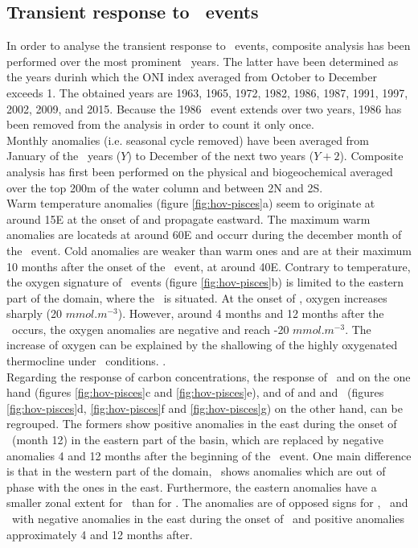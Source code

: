 \clearpage

\subsection{Transient response to \nino\ events}

In order to analyse the transient response to \nino\ events, composite analysis has been performed over the most prominent \nino\ years. The latter have been determined as the years durinh which the ONI index averaged from October to December exceeds 1. The obtained years are 1963, 1965, 1972, 1982, 1986, 1987, 1991, 1997, 2002, 2009, and 2015. Because the 1986 \nino\ event extends over two years, 1986 has been removed from the analysis in order to count it only once.\\
 
Monthly anomalies (i.e. seasonal cycle removed) have been averaged from January of the \nino\ years ($Y$) to December of the next two years ($Y + 2$). Composite analysis has first been performed on the physical and biogeochemical averaged over the top 200m of the water column and between 2N and 2S. \\

Warm temperature anomalies (figure \ref{fig:hov-pisces}a) seem to originate at around 15E at the onset of \nino and propagate eastward. The maximum warm anomalies are locateds at around 60E and occurr during the december month of the \nino\ event. Cold anomalies are weaker than warm ones and are at their maximum 10 months after the onset of the \nino\ event, at around 40E.
Contrary to temperature, the oxygen signature of \nino\ events (figure \ref{fig:hov-pisces}b) is limited to the eastern part of the domain, where the \omz\ is situated. At the onset of \nino , oxygen increases sharply (20 $mmol.m^{-3}$). However, around 4 months and 12 months after the \nino\ occurs, the oxygen anomalies are negative and reach -20 $mmol.m^{-3}$. The increase of oxygen can be explained by the shallowing of the highly oxygenated thermocline under \nino\ conditions. .\\

Regarding the response of carbon concentrations, the response of \phy\ and \zoo on the one hand (figures \ref{fig:hov-pisces}c and \ref{fig:hov-pisces}e), and of \phyd and \zood and \goc\ (figures \ref{fig:hov-pisces}d, \ref{fig:hov-pisces}f and \ref{fig:hov-pisces}g) on the other hand, can be regrouped. The formers show positive anomalies in the east during the onset of \nino\ (month 12) in the eastern part of the basin, which are replaced by negative anomalies 4 and 12 months after the beginning of the \nino\ event. One main difference is that in the western part of the domain, \zoo\ shows anomalies which are out of phase with the ones in the east. Furthermore, the eastern anomalies have a smaller zonal extent for \zoo\ than for \phy. The anomalies are of opposed signs for \phyd , \zood\ and \goc\, with negative anomalies in the east during the onset of \nino\, and positive anomalies approximately 4 and 12 months after. \\

